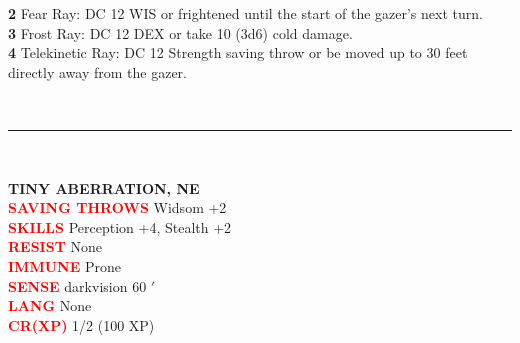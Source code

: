 \documentclass{article}
\begin{document}
\begin{adjustbox}{minipage=0.45\textwidth, margin=\fboxsep, bgimage=../images/texture2.pdf}
{\begin{minipage}[t][10.5in][t]{0.9\textwidth}
\begin{minipage}[t]{0.7\textwidth}
			\textbf{2} Fear Ray: DC 12 WIS or frightened until the start of the gazer's next turn. \\
			\textbf{3} Frost Ray: DC 12 DEX or take 10 (3d6) cold damage. \\
			\textbf{4} Telekinetic Ray: DC 12 Strength saving throw or be moved up to 30 feet directly away from the gazer. 
        \end{minipage}
        \vspace{0.025in}\\
        \rule{\textwidth}{1pt}\\
        \vspace{-0.08in}
        \begin{flushleft}
            {\large\textbf{TINY ABERRATION, NE}}\\
            \textcolor{red}{\textbf{SAVING THROWS}} Widsom +2  \\
            \textcolor{red}{\textbf{SKILLS}} Perception +4, Stealth +2 \\
            \textcolor{red}{\textbf{RESIST}} None \\
            \textcolor{red}{\textbf{IMMUNE}} Prone\\
            \textcolor{red}{\textbf{SENSE}} darkvision 60 $'$\\
            \textcolor{red}{\textbf{LANG}} None\\
            \textcolor{red}{\textbf{CR(XP)}}  1/2 (100 XP)\\
        \end{flushleft}
        \end{minipage}
	}
\end{adjustbox}

\pagebreak
\end{document}
